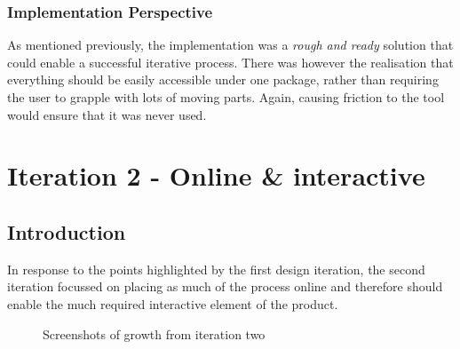\documentclass[a4paper,11pt,titlepage]{article}
\begin{document}
		\subsubsection{Implementation Perspective}	
		As mentioned previously, the implementation was a \textit{rough and ready} solution that could enable a successful iterative process. There was however the realisation that everything should be easily accessible under one package, rather than requiring the user to grapple with lots of moving parts. Again, causing friction to the tool would ensure that it was never used.
		
\clearpage 

\section{Iteration 2 - Online \& interactive}
	\subsection{Introduction}
	In response to the points highlighted by the first design iteration, the second iteration focussed on placing as much of the process online and therefore should enable the much required interactive element of the product. 
	
	\begin{figure}[H]
    			\centering	
    			\qquad
    			 \qquad
    			\caption{Screenshots of growth from iteration two}%
    			\label{fig:iter2}
	\end{figure}	
	
\end{document}
